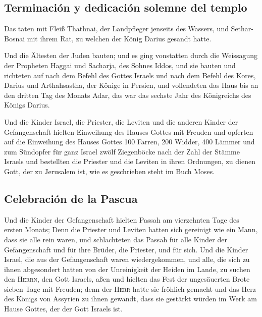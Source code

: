 \hypertarget{terminaciuxf3n-y-dedicaciuxf3n-solemne-del-templo}{%
\subsection{Terminación y dedicación solemne del
templo}\label{terminaciuxf3n-y-dedicaciuxf3n-solemne-del-templo}}

 Das taten mit Fleiß Thathnai, der Landpfleger jenseits
des Wassers, und Sethar-Bosnai mit ihrem Rat, zu welchen der König
Darius gesandt hatte.

 Und die Ältesten der Juden bauten; und es ging
vonstatten durch die Weissagung der Propheten Haggai und Sacharja, des
Sohnes Iddos, und sie bauten und richteten auf nach dem Befehl des
Gottes Israels und nach dem Befehl des Kores, Darius und Arthahsastha,
der Könige in Persien,  und vollendeten das Haus bis an
den dritten Tag des Monats Adar, das war das sechste Jahr des
Königreichs des Königs Darius.

 Und die Kinder Israel, die Priester, die Leviten und die
anderen Kinder der Gefangenschaft hielten Einweihung des Hauses Gottes
mit Freuden  und opferten auf die Einweihung des Hauses
Gottes 100 Farren, 200 Widder, 400 Lämmer und zum Sündopfer für ganz
Israel zwölf Ziegenböcke nach der Zahl der Stämme Israels
 und bestellten die Priester und die Leviten in ihren
Ordnungen, zu dienen Gott, der zu Jerusalem ist, wie es geschrieben
steht im Buch Moses.

\hypertarget{celebraciuxf3n-de-la-pascua}{%
\subsection{Celebración de la
Pascua}\label{celebraciuxf3n-de-la-pascua}}

 Und die Kinder der Gefangenschaft hielten Passah am
vierzehnten Tage des ersten Monats;  Denn die Priester
und Leviten hatten sich gereinigt wie ein Mann, dass sie alle rein
waren, und schlachteten das Passah für alle Kinder der Gefangenschaft
und für ihre Brüder, die Priester, und für sich.  Und die
Kinder Israel, die aus der Gefangenschaft waren wiedergekommen, und
alle, die sich zu ihnen abgesondert hatten von der Unreinigkeit der
Heiden im Lande, zu suchen den \textsc{Herrn}, den Gott Israels, aßen
 und hielten das Fest der ungesäuerten Brote sieben Tage
mit Freuden; denn der \textsc{Herr} hatte sie fröhlich gemacht und das
Herz des Königs von Assyrien zu ihnen gewandt, dass sie gestärkt würden
im Werk am Hause Gottes, der der Gott Israels ist.

